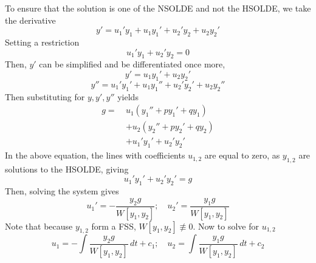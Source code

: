 \documentclass[diffeq.tex]{subfiles}
\begin{document}
    \begin{bproof*}[14.1]
        To ensure that the solution is one of the NSOLDE and not the HSOLDE, we take the derivative
        \begin{equation}
            y' = u_{1}'y_{1} + u_{1}y_{1}' + u_{2}'y_{2} + u_{2}y_{2}'
        \end{equation}
        Setting a restriction
        \begin{equation}
            u_{1}'y_{1} + u_{2}'y_{2} = 0
        \end{equation}
        Then, $y'$ can be simplified and be differentiated once more,
        \begin{equation}
            y' = u_{1}y_{1}' + u_{2}y_{2}'
        \end{equation}
        \begin{equation}
            y'' = u_{1}'y_{1}' + u_{1}y_{1}'' + u_{2}'y_{2}' + u_{2}y_{2}''
        \end{equation}
        Then substituting for $y, y', y''$ yields
        \begin{equation}
            \begin{alignedat}{1}
                g =\ &u_{1}\left(y_{1}'' + py_{1}' + qy_{1}\right)\\
                &+u_{2}\left(y_{2}'' + py_{2}' + qy_{2}\right)\\
                &+u_{1}'y_{1}' + u_{2}'y_{2}'
            \end{alignedat}
        \end{equation}
        In the above equation, the lines with coefficients $u_{1,2}$ are equal to zero, as $y_{1,2}$ are solutions to the HSOLDE, giving
        \begin{equation}
            u_{1}'y_{1}' + u_{2}'y_{2}' = g
        \end{equation}
        Then, solving the system gives
        \begin{equation}
            u_{1}' = -\frac{y_{2}g}{W[y_{1}, y_{2}]};\quad u_{2}' = \frac{y_{1}g}{W[y_{1}, y_{2}]}
        \end{equation}
        Note that because $y_{1,2}$ form a FSS, $W[y_{1}, y_{2}] \nequiv 0$. Now to solve for $u_{1,2}$
        \begin{equation}
            u_{1} = -\int \frac{y_{2}g}{W[y_{1},y_{2}]}\,dt + c_{1};\quad u_{2} = \int \frac{y_{1}g}{W[y_{1},y_{2}]}\,dt + c_{2}
        \end{equation}
    \end{bproof*}
\end{document}
